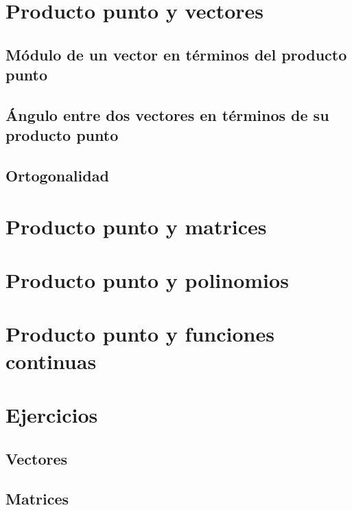 \documentclass{article}
\begin{document}
    \section{Producto punto y vectores}
    
        \subsection{Módulo de un vector en términos del producto punto}



        \subsection{Ángulo entre dos vectores en términos de su producto punto}



        \subsection{Ortogonalidad}



    \section{Producto punto y matrices}



    \section{Producto punto y polinomios}



    \section{Producto punto y funciones continuas}



    \section{Ejercicios}

        \subsection{Vectores}



        \subsection{Matrices}
\end{document}
